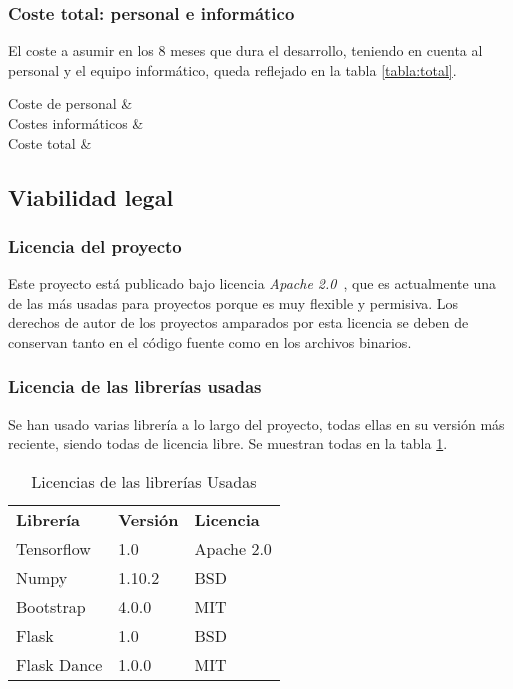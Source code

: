 \subsubsection{Coste total: personal e informático}
El coste a asumir en los 8 meses que dura el desarrollo, teniendo en cuenta al personal y el equipo informático, queda reflejado en la tabla \ref{tabla:total}.


{
	Coste de personal  & \\
	Costes informáticos  & \\\hline
	Coste total & \\
}



\subsection{Viabilidad legal}

\subsubsection{Licencia del proyecto}
Este proyecto está publicado bajo licencia \textit{Apache 2.0}~\cite{apache}, que es actualmente una de las más usadas para proyectos porque es muy flexible y permisiva. Los derechos de autor de los proyectos amparados por esta licencia se deben de conservan tanto en el código fuente como en los archivos binarios.

\subsubsection{Licencia de las librerías usadas}
Se han usado varias librería a lo largo del proyecto, todas ellas en su versión más reciente, siendo todas de licencia libre. Se muestran todas en la tabla \ref{tabla:licenses}.

 \begin{table}
	\begin{center}
		\begin{tabular}{p{3.5cm} p{1.5cm} p{2.5cm}}
			\toprule
			\textbf{Librería} & \textbf{Versión} & \textbf{Licencia} \\
			\otoprule
			Tensorflow & 1.0 & Apache 2.0 \\
			Numpy & 1.10.2 & BSD \\
			Bootstrap & 4.0.0 & MIT \\
			Flask & 1.0 & BSD\\
			Flask Dance & 1.0.0 & MIT \\
			\bottomrule
		\end{tabular}
		\caption{Licencias de las librerías Usadas}
		\label{tabla:licenses}
	\end{center}
\end{table}



